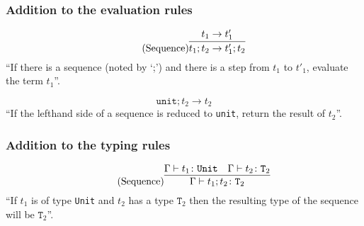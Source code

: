 \subsubsection{Addition to the evaluation rules \cite{pierce2002ProgLang}}
\begin{equation*}
    \tag{Sequence}
    \infer{
        t_1 ; t_2 \rightarrow t'_1 ; t_2
    }{
        t_1 \rightarrow t'_1
    }
\end{equation*}
``If there is a sequence (noted by `;') and there is a step from $t_1$ to
$t'_1$, evaluate the term $t_1$''.

\begin{equation*}
    \tag{Sequence Next}
    \texttt{unit} ; t_2 \rightarrow t_2
\end{equation*}
``If the lefthand side of a sequence is reduced to \texttt{unit},
return the result of $t_2$''.

\subsubsection{Addition to the typing rules \cite{pierce2002ProgLang}}
\begin{equation*}
    \tag{Sequence}
    \infer{
        \Gamma \vdash t_1 ; t_2 \colon \texttt{T}_2
    }{
        \Gamma \vdash t_1 \colon \texttt{Unit} & \Gamma \vdash t_2 \colon \texttt{T}_2
    }
\end{equation*}
``If $t_1$ is of type \texttt{Unit} and $t_2$ has a type $\texttt{T}_2$ then
the resulting type of the sequence will be $\texttt{T}_2$''.
